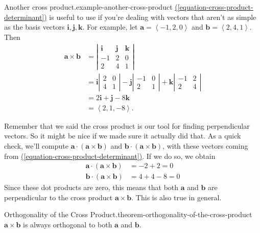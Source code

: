 \documentclass[10pt,]{book}
\numberwithin{equation}{section}
\newcommand{\vv}[1]{\mathbf{#1}}
\newcommand{\dotprod}[1]{\left\langle #1 \right\rangle}
\begin{document}
\begin{example}{Another cross product.}{example-another-cross-product}%
\hypertarget{p-1170}{}%
\hyperref[equation-cross-product-determinant]{(\ref{equation-cross-product-determinant})} is useful to use if you're dealing with vectors that aren't as simple as the basis vectors \(\vv{i},\vv{j},\vv{k}\). For example, let \(\vv{a} = \dotprod{-1,2,0}\) and \(\vv{b} = \dotprod{2,4,1}\). Then%
%
\begin{align*}
\vv{a}\times\vv{b} & = \left|\begin{array}{ccc}
\vv{i} & \vv{j} & \vv{k} \\
-1 & 2 & 0 \\
2 & 4 & 1 \end{array}\right| \\
& = \vv{i}\left|\begin{array}{cc} 2 & 0 \\ 4 & 1\end{array}\right| - \vv{j}\left|\begin{array}{cc} -1 & 0 \\ 2 & 1\end{array}\right| + \vv{k}\left|\begin{array}{cc} -1 & 2 \\ 2 & 4\end{array}\right|\\
& = 2\vv{i}+\vv{j}-8\vv{k}\\
& = \dotprod{2,1,-8}. 
\end{align*}
\end{example}
\hypertarget{p-1171}{}%
Remember that we said the cross product is our tool for finding perpendicular vectors. So it might be nice if we made sure it actually did that. As a quick check, we'll compute \(\vv{a}\cdot(\vv{a}\times\vv{b})\) and \(\vv{b}\cdot(\vv{a}\times\vv{b})\), with these vectors coming from \hyperref[equation-cross-product-determinant]{(\ref{equation-cross-product-determinant})}. If we do so, we obtain%
%
\begin{align*}
\vv{a}\cdot(\vv{a}\times\vv{b}) & = -2 + 2 = 0 \\
\vv{b}\cdot(\vv{a}\times\vv{b}) & = 4 + 4 - 8 = 0 
\end{align*}
\hypertarget{p-1172}{}%
Since these dot products are zero, this means that both \(\vv{a}\) and \(\vv{b}\) are perpendicular to the cross product \(\vv{a}\times\vv{b}\). This is also true in general.%
\begin{theorem}{Orthogonality of the Cross Product.}{}{theorem-orthogonality-of-the-cross-product}%
\hypertarget{p-1173}{}%
\(\vv{a}\times\vv{b}\) is always orthogonal to both \(\vv{a}\) and \(\vv{b}\).%
\end{theorem}
\end{document}
